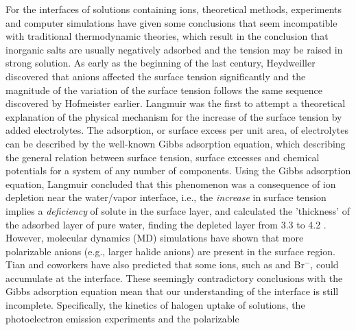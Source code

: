 For the interfaces of solutions containing ions, theoretical methods, experiments and computer simulations have given some conclusions that seem incompatible with traditional thermodynamic theories, which result in the conclusion that inorganic salts are usually negatively adsorbed and the tension may
be raised in strong solution\cite{Gibbs1928, Adam1941}.
As early as the beginning of the last century, Heydweiller discovered that anions affected the surface tension significantly
and the magnitude of the variation of the surface tension follows the same sequence discovered by Hofmeister earlier\cite{dosSantos10}.
Langmuir\cite{Langmuir1917} was the first to attempt a theoretical explanation of the physical mechanism for the increase of the surface tension by added electrolytes.
The adsorption, or surface excess per unit area, of electrolytes can be described by the well-known Gibbs adsorption equation, which describing the general relation between
surface tension, surface excesses and chemical potentials for a system of any number of components.
Using the Gibbs adsorption equation, Langmuir concluded that this phenomenon was a consequence of ion depletion 
near the water/vapor interface, i.e., the \emph{increase} in surface tension 
implies a \emph{deficiency} of solute in the surface layer\cite{Jarvis1968}, and
calculated the 'thickness' of the adsorbed layer of pure water, finding 
the depleted layer from 3.3 to 4.2 \A. 
%
However, molecular dynamics (MD) simulations have shown that more polarizable anions (e.g., larger halide anions) 
are present in the surface region\cite{Jungwirth2001,Jungwirth2002}. 
Tian and coworkers\cite{CST11} have also predicted that some ions, such as \I and Br$^{-}$, could accumulate at the interface.
These seemingly contradictory conclusions with the Gibbs adsorption equation mean that our understanding of the interface is still incomplete. 
Specifically, the kinetics of halogen uptake of solutions\cite{HuJH95}, the photoelectron emission experiments\cite{Markovich1991,Ghosal05,Garrett04} and the polarizable 
